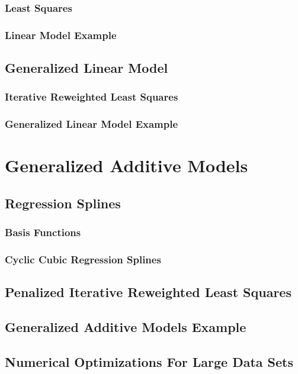 \documentclass{article}
\begin{document}
        \subsubsection{Least Squares}
        \subsubsection{Linear Model Example }
        \subsection{Generalized Linear Model}
        \subsubsection{Iterative Reweighted Least Squares}
        \subsubsection{Generalized Linear Model Example}
    
    \section{Generalized Additive Models}
        \subsection{Regression Splines}
            \subsubsection{Basis Functions}
            \subsubsection{Cyclic Cubic Regression Splines}
        \subsection{Penalized Iterative Reweighted Least Squares}
        \subsection{Generalized Additive Models Example}
        \subsection{Numerical Optimizations For Large Data Sets}
    
\end{document}
